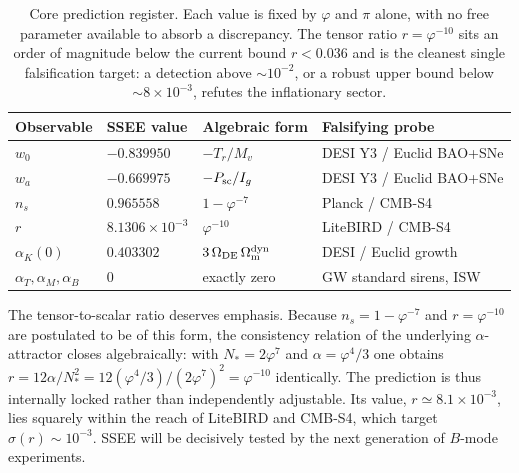 \documentclass[a4paper,11pt]{article}
\newcommand{\Om}{\Omega_{\mathrm{m}}}
\begin{document}
\begin{table}[h]
\centering
\begin{tabular}{@{}llll@{}}
\toprule
Observable & SSEE value & Algebraic form & Falsifying probe \\
\midrule
$w_0$            & $-0.839950$              & $-T_r/M_v$            & DESI Y3 / Euclid BAO+SNe \\
$w_a$            & $-0.669975$              & $-P_{\rm sc}/I_g$ & DESI Y3 / Euclid BAO+SNe \\
$n_s$            & $0.965558$               & $1-\varphi^{-7}$      & Planck / CMB-S4 \\
$r$              & $8.1306\times10^{-3}$     & $\varphi^{-10}$       & LiteBIRD / CMB-S4 \\
$\alpha_K(0)$    & $0.403302$               & $3\,\Omega_{\rm DE}\,\Om^{\mathrm{dyn}}$ & DESI / Euclid growth \\
$\alpha_T,\alpha_M,\alpha_B$ & $0$        & exactly zero          & GW standard sirens, ISW \\
\bottomrule
\end{tabular}
\caption{Core prediction register. Each value is fixed by $\varphi$ and $\pi$
alone, with no free parameter available to absorb a discrepancy. The tensor
ratio $r=\varphi^{-10}$ sits an order of magnitude below the current bound
$r<0.036$ and is the cleanest single falsification target: a detection above
$\sim10^{-2}$, or a robust upper bound below $\sim8\times10^{-3}$, refutes the
inflationary sector.}
\label{tab:predictions-core}
\end{table}

The tensor-to-scalar ratio deserves emphasis. Because $n_s=1-\varphi^{-7}$ and
$r=\varphi^{-10}$ are postulated to be of this form, the consistency relation of
the underlying $\alpha$-attractor closes algebraically: with $N_*=2\varphi^7$
and $\alpha=\varphi^4/3$ one obtains
$r=12\alpha/N_*^2=12(\varphi^4/3)/(2\varphi^7)^2=\varphi^{-10}$ identically. The
prediction is thus internally locked rather than independently adjustable. Its
value, $r\simeq8.1\times10^{-3}$, lies squarely within the reach of LiteBIRD and
CMB-S4, which target $\sigma(r)\sim10^{-3}$. SSEE will be decisively tested by
the next generation of $B$-mode experiments.
\end{document}
